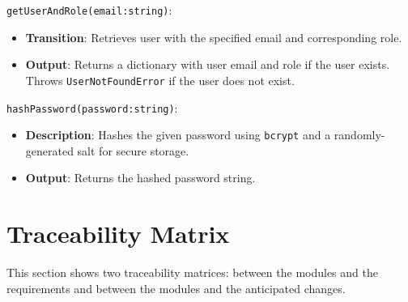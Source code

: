 \documentclass[12pt, titlepage]{article}
\begin{document}
\begin{description}
  \item
  \texttt{getUserAndRole(email:string)}:
  \item
  \begin{itemize}
    \item \textbf{Transition}: Retrieves user with the specified email and
    corresponding role.
  \end{itemize}
  \item
  \begin{itemize}
    \item \textbf{Output}: Returns a dictionary with user email and role if the user exists. Throws \texttt{UserNotFoundError} if the user does not exist.
  \end{itemize}

  \item[Local Function:]
  \item
  \texttt{hashPassword(password:string)}:
  \item
  \begin{itemize}
    \item \textbf{Description}: Hashes the given password using \texttt{bcrypt}
    and a randomly-generated salt for secure storage.
  \end{itemize}
  \item 
  \begin{itemize}
    \item \textbf{Output}: Returns the hashed password string.
  \end{itemize}
\end{description}

\section{Traceability Matrix} \label{SecTM}

This section shows two traceability matrices: between the modules and the
requirements and between the modules and the anticipated changes.
\end{document}

